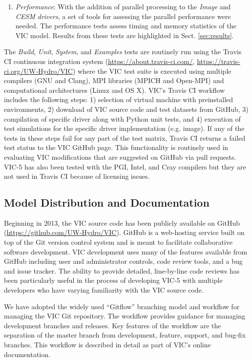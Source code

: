 \documentclass[gmd, manuscript]{copernicus}
\begin{document}
\begin{enumerate}
      \item \textit{Performance}: With the addition of parallel processing to the \textit{Image} and \textit{CESM drivers}, a set of tools for assessing the parallel performance were needed. The performance tests assess timing and memory statistics of the VIC model. Results from these tests are highlighted in Sect. \ref{sec:results}.
    \end{enumerate}

    The \textit{Build}, \textit{Unit}, \textit{System}, and \textit{Examples} tests are routinely run using the Travis CI continuous integration system (\url{https://about.travis-ci.com/}, \url{https://travis-ci.org/UW-Hydro/VIC}) where the VIC test suite is executed using multiple compilers (GNU and Clang), MPI libraries (MPICH and Open-MPI) and computational architectures (Linux and OS X). VIC's Travis CI workflow includes the following steps: 1) selection of virtual machine with preinstalled environments, 2) download of VIC source code and test datasets from GitHub, 3) compilation of specific driver along with Python unit tests, and 4) execution of test simulations for the specific driver implementation (e.g. image). If any of the tests in these steps fail for any part of the test matrix, Travis CI returns a failed test status to the VIC GitHub page. This functionality is routinely used in evaluating VIC modifications that are suggested on GitHub via pull requests. VIC-5 has also been tested with the PGI, Intel, and Cray compilers but they are not used in Travis CI because of licensing issues.

  \subsection{Model Distribution and Documentation}

    Beginning in 2013, the VIC source code has been publicly available on GitHub (\url{https://github.com/UW-Hydro/VIC}). GitHub is a web-hosting service built on top of the Git version control system and is meant to facilitate collaborative software development. VIC development uses many of the features available from GitHub including user and administrator controls, code review tools, and a bug and issue tracker. The ability to provide detailed, line-by-line code reviews has been particularly useful in the process of developing VIC-5 with multiple developers who have varying familiarity with the VIC source code.

    We have adopted the widely used ``Gitflow'' branching model and workflow for managing the VIC Git repository. The workflow provides guidance for managing development branches and releases. Key features of the workflow are the separation of the master branch from development, feature, support, and bug-fix branches. This workflow is described in detail as part of VIC's online documentation.
\end{document}
